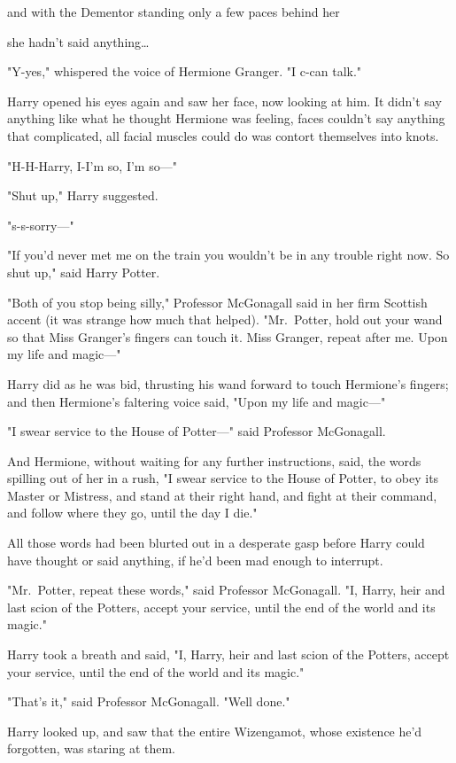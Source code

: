 and with the Dementor standing only a few paces behind her

she hadn't said anything{\ldots}

"Y-yes," whispered the voice of Hermione Granger. "I c-can talk."

Harry opened his eyes again and saw her face, now looking at him. It didn't say
anything like what he thought Hermione was feeling, faces couldn't say anything
that complicated, all facial muscles could do was contort themselves into knots.

"H-H-Harry, I-I'm so, I'm so---"

"Shut up," Harry suggested.

"s-s-sorry---"

"If you'd never met me on the train you wouldn't be in any trouble right now.
So shut up," said Harry Potter.

"Both of you stop being silly," Professor McGonagall said in her firm Scottish
accent (it was strange how much that helped). "Mr.~Potter, hold out your wand
so that Miss Granger's fingers can touch it. Miss Granger, repeat after me.
Upon my life and magic---"

Harry did as he was bid, thrusting his wand forward to touch Hermione's
fingers; and then Hermione's faltering voice said, "Upon my life and magic---"

"I swear service to the House of Potter---" said Professor McGonagall.

And Hermione, without waiting for any further instructions, said, the words
spilling out of her in a rush, "I swear service to the House of Potter, to obey
its Master or Mistress, and stand at their right hand, and fight at their
command, and follow where they go, until the day I die."

All those words had been blurted out in a desperate gasp before Harry could
have thought or said anything, if he'd been mad enough to interrupt.

"Mr.~Potter, repeat these words," said Professor McGonagall. "I, Harry, heir
and last scion of the Potters, accept your service, until the end of the world
and its magic."

Harry took a breath and said, "I, Harry, heir and last scion of the Potters,
accept your service, until the end of the world and its magic."

"That's it," said Professor McGonagall. "Well done."

Harry looked up, and saw that the entire Wizengamot, whose existence he'd
forgotten, was staring at them.

